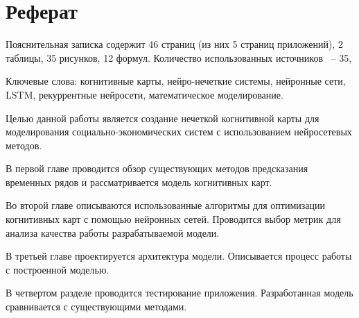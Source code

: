\chapter*{Реферат}
\thispagestyle{plain}

Пояснительная записка содержит 46 страниц (из них 5 страниц приложений),
2 таблицы, 35 рисунков, 12 формул. Количество использованных источников ~-- 35,

Ключевые слова: когнитивные карты, нейро-нечеткие системы,
нейронные сети, LSTM, рекуррентные нейросети, математическое моделирование.

Целью данной работы является создание нечеткой когнитивной карты для моделирования
социально-экономических систем с использованием нейросетевых методов.

В первой главе проводится обзор существующих методов предсказания временных рядов
и рассматривается модель когнитивных карт.

Во второй главе описываются использованные алгоритмы для оптимизации
когнитивных карт с помощью нейронных сетей.
Проводится выбор метрик для анализа качества работы разрабатываемой модели.

В третьей главе проектируется архитектура модели.
Описывается процесс работы с построенной моделью.

В четвертом разделе проводится тестирование приложения.
Разработанная модель сравнивается с существующими методами.
